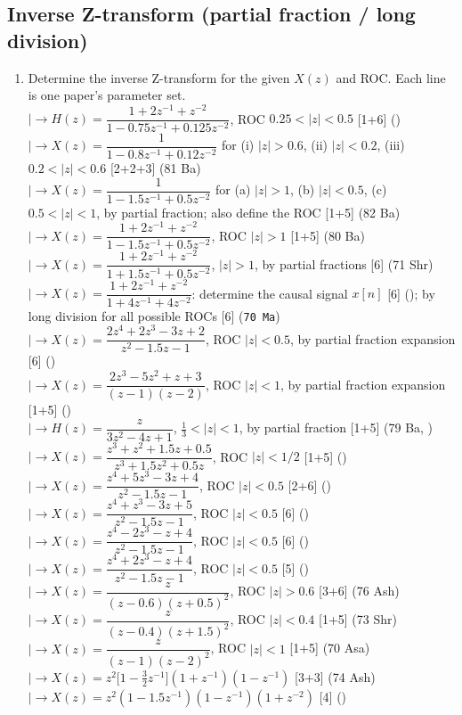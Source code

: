 \documentclass[12pt]{article}
\newcommand{\lb}{\\$\left|\rightarrow\right.$}
\begin{document}
  \subsection{Inverse Z-transform (partial fraction / long division)}
    \begin{enumerate}[topsep=0pt, noitemsep]
      \item Determine the inverse Z-transform for the given $X(z)$ and ROC. Each line is one paper's parameter set.
        \lb $H(z)=\dfrac{1+2z^{-1}+z^{-2}}{1-0.75z^{-1}+0.125z^{-2}}$, ROC $0.25<|z|<0.5$ \hfill [1+6] ()
        \lb $X(z)=\dfrac{1}{1-0.8z^{-1}+0.12z^{-2}}$ for (i) $|z|>0.6$, (ii) $|z|<0.2$, (iii) $0.2<|z|<0.6$ \hfill [2+2+3] (81 Ba)
        \lb $X(z)=\dfrac{1}{1-1.5z^{-1}+0.5z^{-2}}$ for (a) $|z|>1$, (b) $|z|<0.5$, (c) $0.5<|z|<1$, by partial fraction; also define the ROC \hfill [1+5] (82 Ba)
        \lb $X(z)=\dfrac{1+2z^{-1}+z^{-2}}{1-1.5z^{-1}+0.5z^{-2}}$, ROC $|z|>1$ \hfill [1+5] (80 Ba)
        \lb $X(z)=\dfrac{1+2z^{-1}+z^{-2}}{1+1.5z^{-1}+0.5z^{-2}}$, $|z|>1$, by partial fractions \hfill [6] (71 Shr)
        \lb $X(z)=\dfrac{1+2z^{-1}+z^{-2}}{1+4z^{-1}+4z^{-2}}$: determine the causal signal $x[n]$ \hfill [6] (); by long division for all possible ROCs \hfill [6] (\texttt{70 Ma})
        \lb $X(z)=\dfrac{2z^4+2z^3-3z+2}{z^2-1.5z-1}$, ROC $|z|<0.5$, by partial fraction expansion \hfill [6] ()
        \lb $X(z)=\dfrac{2z^3-5z^2+z+3}{(z-1)(z-2)}$, ROC $|z|<1$, by partial fraction expansion \hfill [1+5] ()
        \lb $H(z)=\dfrac{z}{3z^2-4z+1}$, $\tfrac13<|z|<1$, by partial fraction \hfill [1+5] (79 Ba, )
        \lb $X(z)=\dfrac{z^3+z^2+1.5z+0.5}{z^3+1.5z^2+0.5z}$, ROC $|z|<1/2$ \hfill [1+5] ()
        \lb $X(z)=\dfrac{z^4+5z^3-3z+4}{z^2-1.5z-1}$, ROC $|z|<0.5$ \hfill [2+6] ()
        \lb $X(z)=\dfrac{z^4+z^3-3z+5}{z^2-1.5z-1}$, ROC $|z|<0.5$ \hfill [6] ()
        \lb $X(z)=\dfrac{z^4-2z^3-z+4}{z^2-1.5z-1}$, ROC $|z|<0.5$ \hfill [6] ()
        \lb $X(z)=\dfrac{z^4+2z^3-z+4}{z^2-1.5z-1}$, ROC $|z|<0.5$ \hfill [5] ()
        \lb $X(z)=\dfrac{z}{(z-0.6)(z+0.5)^2}$, ROC $|z|>0.6$ \hfill [3+6] (76 Ash)
        \lb $X(z)=\dfrac{z}{(z-0.4)(z+1.5)^2}$, ROC $|z|<0.4$ \hfill [1+5] (73 Shr)
        \lb $X(z)=\dfrac{z}{(z-1)(z-2)^2}$, ROC $|z|<1$ \hfill [1+5] (70 Asa)
        \lb $X(z)=z^2\big[1-\tfrac32 z^{-1}\big](1+z^{-1})(1-z^{-1})$ \hfill [3+3] (74 Ash)
        \lb $X(z)=z^2(1-1.5z^{-1})(1-z^{-1})(1+z^{-2})$ \hfill [4] ()

\end{enumerate}
\end{document}
